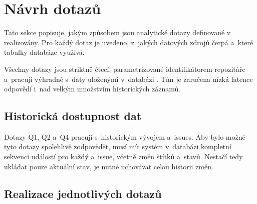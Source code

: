 
\section{Návrh dotazů}
\label{sec:queries}

Tato sekce popisuje, jakým způsobem jsou analytické dotazy definované v~ realizovány. Pro každý dotaz je uvedeno, z~jakých datových zdrojů čerpá a~které tabulky databáze využívá.

Všechny dotazy jsou striktně čtecí, parametrizované identifikátorem repozitáře a~pracují výhradně s~daty uloženými v~databázi . Tím je zaručena nízká latence odpovědí i~nad velkým množstvím historických záznamů.

\subsection{Historická dostupnost dat}
\label{subsec:queries:historical_data}

Dotazy Q1, Q2 a~Q4 pracují s~historickým vývojem \PR a~issues. Aby bylo možné tyto dotazy spolehlivě zodpovědět, musí mít systém v~databázi kompletní sekvenci událostí pro každý \PR a~issue, včetně změn štítků a~stavů. Nestačí tedy ukládat pouze aktuální stav, je nutné uchovávat celou historii změn.

\subsection{Realizace jednotlivých dotazů}
\label{subsec:queries:design}

